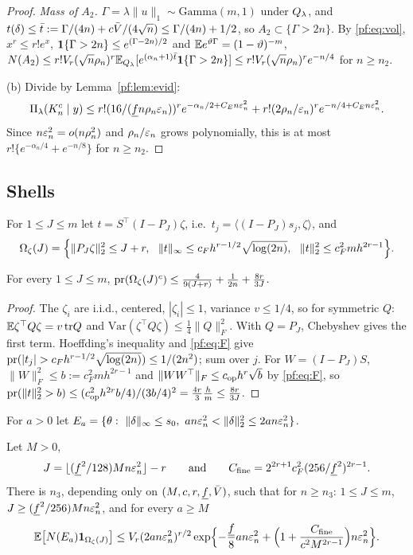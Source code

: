 \begin{proof}
\emph{Mass of $A_2$.} $\Gamma=\lambda\|u\|_1\sim\mathrm{Gamma}(m,1)$ under $Q_\lambda$, and $t(\delta)\le\bar t:=\Gamma/(4n)+c\bar V/(4\sqrt n)\le\Gamma/(4n)+1/2$, so $A_2\subset\{\Gamma>2n\}$. By \eqref{pf:eq:vol}, $x^r\le r!e^x$, $\mathbf 1\{\Gamma>2n\}\le e^{(\Gamma-2n)/2}$ and $\mathbb{E} e^{\vartheta\Gamma}=(1-\vartheta)^{-m}$,
$N(A_2)\le r!V_r(\sqrt n\rho_n)^r\mathbb{E}_{Q_\lambda}[e^{(\alpha_n+1)\bar t}\mathbf 1\{\Gamma>2n\}]\le r!V_r(\sqrt n\rho_n)^re^{-n/4}$ for $n\ge n_2$.

(b) Divide by Lemma~\ref{pf:lem:evid}:
\[
\Pi_\lambda(K_n^c\mid y)\le r!(16/(\underline f n\rho_n\varepsilon_n))^re^{-\alpha_n/2+C_En\varepsilon_n^2}+r!(2\rho_n/\varepsilon_n)^re^{-n/4+C_En\varepsilon_n^2}.
\]
Since $n\varepsilon_n^2=o(n\rho_n^2)$ and $\rho_n/\varepsilon_n$ grows polynomially, this is at most $r!\{e^{-\alpha_n/4}+e^{-n/8}\}$ for $n\ge n_2$.
\end{proof}

\subsection{Shells}

For $1\le J\le m$ let $t=S^\top(I-P_J)\zeta$, i.e.\ $t_j=\langle(I-P_J)s_j,\zeta\rangle$, and
\[
\Omega_\zeta(J)=\Bigl\{\|P_J\zeta\|_2^2\le J+r,\ \ \|t\|_\infty\le c_Fh^{r-1/2}\sqrt{\log(2n)},\ \ \|t\|_2^2\le c_F^2mh^{2r-1}\Bigr\}.
\]

\begin{lemma}\label{pf:lem:score}
For every $1\le J\le m$, $\mathrm{pr}(\Omega_\zeta(J)^c)\le\frac4{9(J+r)}+\frac1{2n}+\frac{8r}{3J}$.
\end{lemma}

\begin{proof}
The $\zeta_i$ are i.i.d., centered, $|\zeta_i|\le1$, variance $v\le1/4$, so for symmetric $Q$: $\mathbb{E}\zeta^\top Q\zeta=v\,\mathrm{tr}Q$ and $\mathrm{Var}(\zeta^\top Q\zeta)\le\frac14\|Q\|_F^2$. With $Q=P_J$, Chebyshev gives the first term. Hoeffding's inequality and \eqref{pf:eq:F} give $\pr(|t_j|>c_Fh^{r-1/2}\sqrt{\log(2n)})\le1/(2n^2)$; sum over $j$. For $W=(I-P_J)S$, $\|W\|_F^2\le b:=c_F^2mh^{2r-1}$ and $\|WW^\top\|_F\le c_{\mathrm{op}}h^r\sqrt b$ by \eqref{pf:eq:F}, so $\mathrm{pr}(\|t\|_2^2>b)\le(c_{\mathrm{op}}^2h^{2r}b/4)/(3b/4)^2=\frac{4r}3\frac hm\le\frac{8r}{3J}$.
\end{proof}

For $a>0$ let $E_a=\{\theta:\ \|\delta\|_\infty\le s_0,\ an\en^2<\|\delta\|_2^2\le2an\en^2\}$.

\begin{proposition}[shells]\label{pf:prop:shell}
Let $M>0$,
\[
J=\lfloor(\underline f^2/128)Mn\varepsilon_n^2\rfloor-r\qquad\text{and}\qquad C_{\rm fine}=2^{2r+1}c_F^2(256/\underline f^2)^{2r-1}.
\]
There is $n_3$, depending only on $(M,c,r,\underline f,\bar V)$, such that for $n\ge n_3$: $1\le J\le m$, $J\ge(\underline f^2/256)Mn\varepsilon_n^2$, and for every $a\ge M$
\[
\mathbb{E}\bigl[N(E_a)\mathbf 1_{\Omega_\zeta(J)}\bigr]\le V_r(2an\varepsilon_n^2)^{r/2}\exp\Bigl\{-\frac{\underline f}8an\varepsilon_n^2+\Bigl(1+\frac{C_{\rm fine}}{c^2M^{2r-1}}\Bigr)n\varepsilon_n^2\Bigr\}.
\]
\end{proposition}

